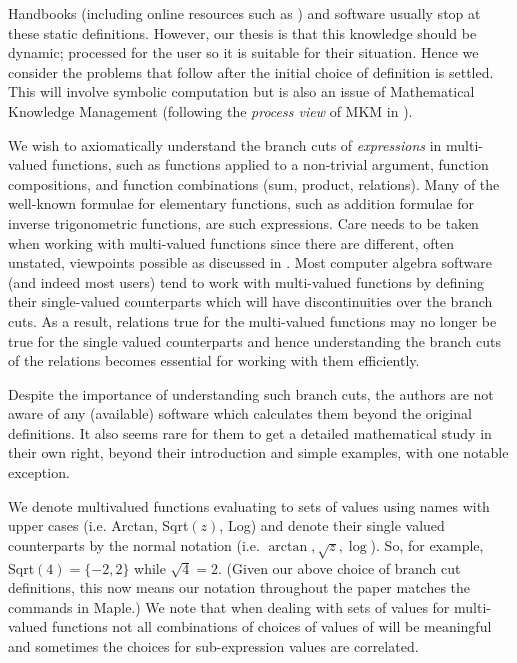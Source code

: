 \documentclass{llncs}
\begin{document}
Handbooks (including online resources such as \cite{NIST}) and software usually stop at these  static definitions.  However, our thesis is that this knowledge should be dynamic; processed for the user so it is suitable for their situation.  Hence we consider the problems that follow after the initial choice of definition is settled.  This will involve symbolic computation but is also an issue of Mathematical Knowledge Management (following the \emph{process view} of MKM in \cite{CF09}).  

We wish to axiomatically understand the branch cuts of \emph{expressions} in multi-valued functions, such as functions applied to a non-trivial argument, function compositions, and function combinations (sum, product, relations).  
Many of the well-known formulae for elementary functions, such as addition formulae for inverse trigonometric functions, are such expressions.  Care needs to be taken when working with multi-valued functions since there are different, often unstated, viewpoints possible as discussed in \cite{Davenport07, Davenport10}.  Most computer algebra software (and indeed most users) tend to work with multi-valued functions by defining their single-valued counterparts which will have discontinuities over the branch cuts.  As a result, relations true for the multi-valued functions may no longer be true for the single valued counterparts and hence understanding the branch cuts of the relations becomes essential for working with them efficiently.  

Despite the importance of understanding such branch cuts, the authors are not aware of any (available) software which calculates them beyond the original definitions.  It also seems rare for them to get a detailed mathematical study in their own right, beyond their introduction and simple examples, with \cite{Markushevich1965a} one notable exception.

We denote multivalued functions evaluating to sets of values using names with upper cases (i.e. Arctan, Sqrt$(z)$, Log) and denote their single valued counterparts by the normal notation (i.e. $\arctan, \sqrt{z}, \log$).  So, for example, Sqrt$(4)=\{-2,2\}$ while $\sqrt{4}=2$.  (Given our above choice of branch cut definitions, this now means our notation throughout the paper matches the commands in {\sc Maple}.)  We note that when dealing with sets of values for multi-valued functions not all combinations of choices of values of will be meaningful and sometimes the choices for sub-expression values are correlated.  
\end{document}
